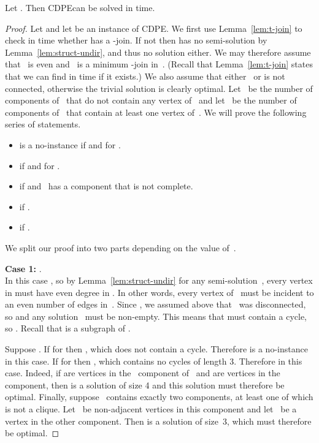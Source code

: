 \documentclass[11pt]{llncs}
\newcommand{\cdpe}{{\sc CDPE}}
\newcommand\displaycase[1]{{\bf #1}}
\begin{document}
\begin{theorem}\label{thm:add-undi}
Let . Then \cdpe can be solved in  time.
\end{theorem} 

\begin{proof}
Let  and let  be an instance of \cdpe.  We first
use Lemma~\ref{lem:t-join} to check in  time whether  has a
-join.  If not then  has no semi-solution by
Lemma~\ref{lem:struct-undir}, and thus no solution either.  We may therefore
assume that~ is even and~ is a minimum -join in~. (Recall that
Lemma~\ref{lem:t-join} states that we can find  in  time if it
exists.) We also assume that either~ or  is not connected,
otherwise the trivial solution  is clearly optimal.  Let~ be
the number of components of~ that do not contain any vertex of~ and
let~ be the number of components of~ that contain at least one vertex
of~. We will prove the following series of statements.

\begin{itemize}
\item  is a no-instance if  and  for .
\item  if  and  for .
\item  if  and~ has a component that is not complete.
\item  if .
\item  if .
\end{itemize}

We split our proof into two parts depending on the value of~.

\medskip
\noindent
\displaycase{Case 1:} .\\
In this case , so by Lemma~\ref{lem:struct-undir} for any
semi-solution~, every vertex in  must have even degree in .
In other words, every vertex of~ must be incident to an even number of edges
in~. Since , we assumed above that~ was disconnected, so 
and any solution~ must be non-empty. This means that  must contain a
cycle, so . Recall that  is
a subgraph of .

Suppose . If  for  then , which
does not contain a cycle. Therefore  is a no-instance in this case.
If  for  then , which contains no
cycles of length 3. Therefore  in this case.  Indeed, if
 are vertices in the~ component of~ and  are vertices in the~
component, then  is a solution of size 4 and this
solution must therefore be optimal.  Finally, suppose~ contains exactly two
components, at least one of which is not a clique. Let~ be non-adjacent
vertices in this component and let~ be a vertex in the other component. Then
 is a solution of size~3, which must therefore be optimal.


\end{proof}
\end{document}
